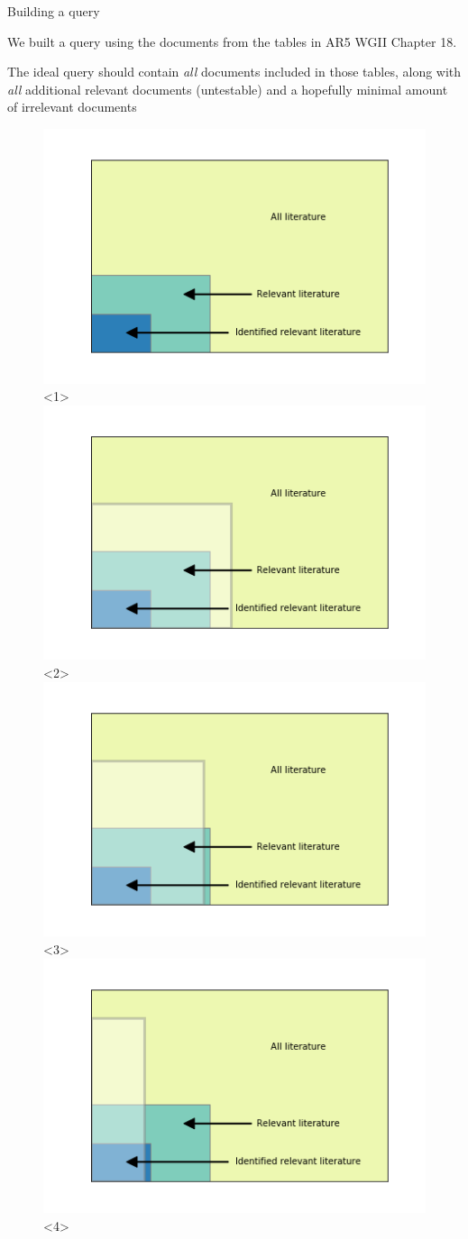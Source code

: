 \documentclass[9pt]{beamer}
\begin{document}
\begin{frame}{Building a query}

We built a query using the documents from the tables in AR5 WGII Chapter 18.

The ideal query should contain \textit{all} documents included in those tables, along with \textit{all} additional relevant documents (untestable) and a hopefully minimal amount of irrelevant documents

\begin{figure}
	\includegraphics[width=0.7\linewidth]{../plots/basic_lit_plot.png}<1>
	\includegraphics[width=0.7\linewidth]{../plots/lit_plot_query_1.png}<2>
	\includegraphics[width=0.7\linewidth]{../plots/lit_plot_query_3.png}<3>
	\includegraphics[width=0.7\linewidth]{../plots/lit_plot_query_2.png}<4>

\end{figure}
\end{frame}
\end{document}

